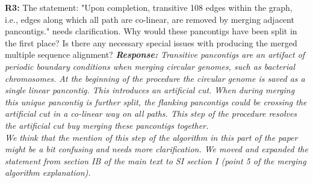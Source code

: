 \documentclass[aps,rmp,onecolumn]{revtex4-1}
\newcommand{\Marco}[1]{{\color{orange}Marco: #1}}
\newcommand{\Liam}[1]{{\color{teal}Liam: #1}}
\newcommand{\reviewer}[2]{\textbf{#1:} #2\vskip 5mm}
\newcommand{\response}[1]{{\it {\color{response}\textbf{Response:} #1}}\vskip 5mm}
\begin{document}
\reviewer{R3}{The statement: "Upon completion, transitive 108 edges within the graph, i.e., edges along which all path are co-linear, are removed by merging adjacent pancontigs." needs clarification. Why would these pancontigs have been split in the first place? Is there any necessary special issues with producing the merged multiple sequence alignment?}
\response{Transitive pancontigs are an artifact of periodic boundary conditions when merging circular genomes, such as bacterial chromosomes. At the beginning of the procedure the circular genome is saved as a single linear pancontig. This introduces an artificial cut. When during merging this unique pancontig is further split, the flanking pancontigs could be crossing the artificial cut in a co-linear way on all paths. This step of the procedure resolves the artificial cut buy merging these pancontigs together.\\
      We think that the mention of this step of the algorithm in this part of the paper might be a bit confusing and needs more clarification. We moved and expanded the statement from section IB of the main text to SI section I (point 5 of the merging algorithm explanation).}
\end{document}
